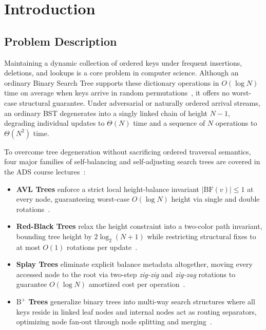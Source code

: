 \documentclass[10pt, a4paper]{article}
\newcommand{\bfactor}[1]{\ensuremath{\mathrm{BF}(#1)}}
\begin{document}
\thispagestyle{plain}
\vspace*{0.3cm}
\tableofcontents
\clearpage

\section{Introduction}

\subsection{Problem Description}
Maintaining a dynamic collection of ordered keys under frequent insertions, deletions, and lookups is a core problem in computer science. Although an ordinary Binary Search Tree supports these dictionary operations in $O(\log N)$ time on average when keys arrive in random permutations~\cite{weiss1996}, it offers no worst-case structural guarantee. Under adversarial or naturally ordered arrival streams, an ordinary BST degenerates into a singly linked chain of height $N-1$, degrading individual updates to $\Theta(N)$ time and a sequence of $N$ operations to $\Theta(N^2)$ time.

To overcome tree degeneration without sacrificing ordered traversal semantics, four major families of self-balancing and self-adjusting search trees are covered in the ADS course lectures~\cite{ads_slides2026}:
\begin{itemize}
  \item \textbf{\color{primary}AVL Trees} enforce a strict local height-balance invariant $|\bfactor{v}| \le 1$ at every node, guaranteeing worst-case $O(\log N)$ height via single and double rotations~\cite{ads_slides2026,weiss1996}.
  \item \textbf{\color{primary}Red-Black Trees} relax the height constraint into a two-color path invariant, bounding tree height by $2\log_2(N+1)$ while restricting structural fixes to at most $O(1)$ rotations per update~\cite{ads_slides2026,cormen2022}.
  \item \textbf{\color{primary}Splay Trees} eliminate explicit balance metadata altogether, moving every accessed node to the root via two-step \emph{zig-zig} and \emph{zig-zag} rotations to guarantee $O(\log N)$ amortized cost per operation~\cite{ads_slides2026,weiss1996}.
  \item \textbf{\color{primary}$\text{B}^+$ Trees} generalize binary trees into multi-way search structures where all keys reside in linked leaf nodes and internal nodes act as routing separators, optimizing node fan-out through node splitting and merging~\cite{ads_slides2026}.
\end{itemize}
\end{document}
